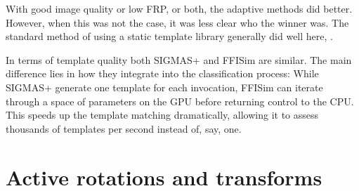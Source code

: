 With good image quality or low FRP, or both, the adaptive methods did better. However, when this was not the case, it was less clear who the winner was. The standard method of using a static template library generally did well here, . 

In terms of template quality both SIGMAS+ and FFISim are similar. The main difference lies in how they integrate into the classification process: While SIGMAS+ generate one template for each invocation, FFISim can iterate through a space of parameters on the GPU before returning control to the CPU. This speeds up the template matching dramatically, allowing it to assess thousands of templates per second instead of, say, one. 
 
%

\ifPhdDoc
\clearpage
\appendix
\renewcommand\thesection{\Roman{section}}
\else
\appendices
\fi

\section{Active rotations and transforms}\label{IV_active_rotations_transforms} 

